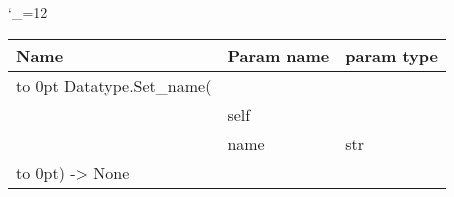\begingroup \catcode`\_=12 \tt
\begin{tabular}{lll}
\toprule
\textrm{Name}&\textrm{Param name}&\textrm{param type}\\
\midrule
\hbox to 0pt {Datatype.Set_name(\hss}\\
& self\\
& name & str\\
\hbox to 0pt{) -> None\hss}\\
\bottomrule
\end{tabular}
\endgroup
